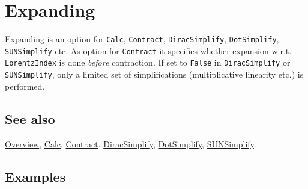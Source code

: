\documentclass[../FeynCalcManual.tex]{subfiles}
\begin{document}
\hypertarget{expanding}{
\section{Expanding}\label{expanding}}

Expanding is an option for \texttt{Calc}, \texttt{Contract},
\texttt{DiracSimplify}, \texttt{DotSimplify}, \texttt{SUNSimplify} etc.
As option for \texttt{Contract} it specifies whether expansion w.r.t.
\texttt{LorentzIndex} is done \emph{before} contraction. If set to
\texttt{False} in \texttt{DiracSimplify} or \texttt{SUNSimplify}, only a
limited set of simplifications (multiplicative linearity etc.) is
performed.

\subsection{See also}

\hyperlink{toc}{Overview}, \hyperlink{calc}{Calc},
\hyperlink{contract}{Contract},
\hyperlink{diracsimplify}{DiracSimplify},
\hyperlink{dotsimplify}{DotSimplify},
\hyperlink{sunsimplify}{SUNSimplify}.

\subsection{Examples}
\end{document}
